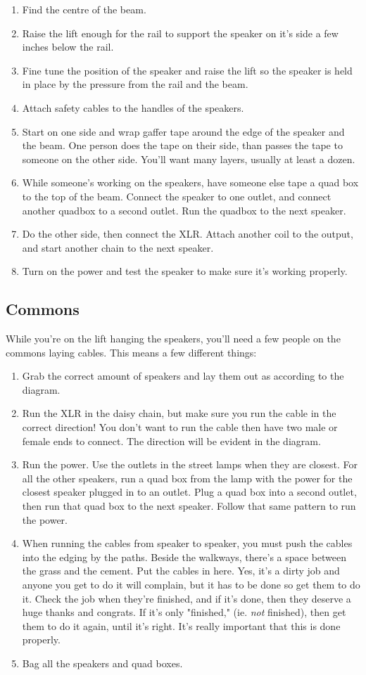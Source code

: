 \documentclass[letterpaper,10pt,oneside,headsepline]{scrreprt}
\begin{document}
\begin{enumerate}
\item Find the centre of the beam.
\item Raise the lift enough for the rail to support the speaker on it's side a few inches below the rail.
\item Fine tune the position of the speaker and raise the lift so the speaker is held in place by the pressure from the rail and the beam.
\item Attach safety cables to the handles of the speakers.
\item Start on one side and wrap gaffer tape around the edge of the speaker and the beam. One person does the tape on their side, than passes the tape to someone on the other side. You'll want many layers, usually at least a dozen.
\item While someone's working on the speakers, have someone else tape a quad box to the top of the beam. Connect the speaker to one outlet, and connect another quadbox to a second outlet. Run the quadbox to the next speaker.
\item Do the other side, then connect the XLR. Attach another coil to the output, and start another chain to the next speaker.
\item Turn on the power and test the speaker to make sure it's working properly.
\end{enumerate}
\subsection{Commons}
While you're on the lift hanging the speakers, you'll need a few people on the commons laying cables. This means a few different things:
\begin{enumerate}
\item Grab the correct amount of speakers and lay them out as according to the diagram. 
\item Run the XLR in the daisy chain, but make sure you run the cable in the correct direction! You don't want to run the cable then have two male or female ends to connect. The direction will be evident in the diagram.
\item Run the power. Use the outlets in the street lamps when they are closest. For all the other speakers, run a quad box from the lamp with the power for the closest speaker plugged in to an outlet. Plug a quad box into a second outlet, then run that quad box to the next speaker. Follow that same pattern to run the power.
\item When running the cables from speaker to speaker, you must push the cables into the edging by the paths. Beside the walkways, there's a space between the grass and the cement. Put the cables in here. Yes, it's a dirty job and anyone you get to do it will complain, but it has to be done so get them to do it. Check the job when they're finished, and if it's done, then they deserve a huge thanks and congrats. If it's only "finished," (ie. \textit{not} finished), then get them to do it again, until it's right. It's really important that this is done properly.
\item Bag all the speakers and quad boxes.
\end{enumerate}
\end{document}
